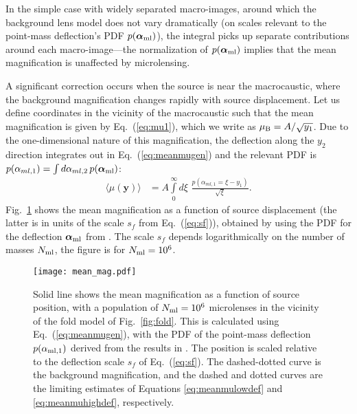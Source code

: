 \documentclass{aastex6}
\newcommand{\bt}[1]{\mathbf #1}
\newcommand{\refeq}[1]{Eq.~(\ref{eq:#1})}
\newcommand{\reffig}[1]{Fig.~\ref{fig:#1}}
\begin{document}
In the simple case with widely separated macro-images, around which the background 
lens model does not vary dramatically (on scales relevant to the point-mass deflection's 
PDF $p(\bm\alpha_{\rm ml})$), the integral picks up separate contributions around each 
macro-image---the normalization of $p(\bm\alpha_{\rm ml})$ implies that the mean 
magnification is unaffected by microlensing. 

A significant correction occurs when the source is near the macrocaustic, where the 
background magnification changes rapidly with source displacement. Let us define 
coordinates in the vicinity of the macrocaustic such that the mean magnification is 
given by \refeq{mu1}, which we write as $\mu_{\rm B} = A/\sqrt{y_1}$. 
Due to the one-dimensional nature of this magnification, the deflection along the 
$y_2$ direction integrates out in \refeq{meanmugen} and the relevant 
PDF is $p(\alpha_{ml, 1}) = \int d\alpha_{ml, 2} \, p(\bm{\alpha}_{\rm ml})$:
\begin{align}
  \langle \mu(\bt y) \rangle & = A \int\limits_{0}^{\infty} d\xi \,\, \frac{p\left(\alpha_{ml, 1} = \xi - y_1\right)}{\sqrt{\xi}} \mbox{.} \label{eq:meanmupl}
\end{align}
\reffig{meanmu} shows the mean magnification as a function of source 
displacement (the latter is in units of the scale $s_f$ from \refeq{sf}), 
obtained by using the PDF for the deflection $\bm{\alpha}_{\rm ml}$ from 
\cite{1986ApJ...306....2K}. The scale $s_f$ depends logarithmically on the number 
of masses $N_{\rm ml}$, the figure is for $N_{\rm ml}=10^6$.
\begin{figure}[t]
\begin{center}
  \texttt{[image: mean\_mag.pdf]}
\caption{\label{fig:meanmu} Solid line shows the mean magnification as a function 
of source position, with a population of $N_{\rm ml}=10^{6}$ microlenses in the vicinity of the 
fold model of \reffig{fold}. This is calculated using \refeq{meanmugen},
with the PDF of the point-mass deflection $p(\alpha_{\rm ml, 1})$ derived from the 
results in \cite{1986ApJ...306....2K}. The position is scaled relative to the deflection scale
$s_f$ of \refeq{sf}. The dashed-dotted curve is the background magnification, 
and the dashed and dotted curves are the limiting estimates of Equations \eqref{eq:meanmulowdef} and \eqref{eq:meanmuhighdef}, respectively.}
\end{center}
\end{figure}
\end{document}
